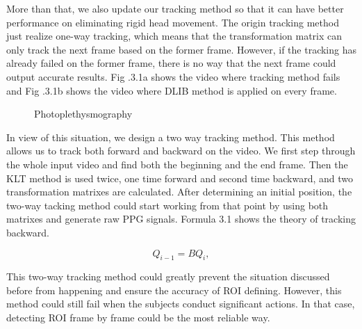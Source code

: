 More than that, we also update our tracking method so that it can have better performance on eliminating rigid head movement. The origin tracking method just realize one-way tracking, which means that the transformation matrix can only track the next frame based on the former frame. However, if the tracking has already failed on the former frame, there is no way that the next frame could output accurate results. Fig .3.1a shows the video where tracking method fails and Fig .3.1b shows the video where DLIB method is applied on every frame. 

\begin{figure}[ht]
\hspace{-0.5in}
\caption{Photoplethysmography }\label{fig:noted-figure}
\end{figure}

In view of this situation, we design a two way tracking method. This method allows us to track both forward and backward on the video. We first step through the whole input video and find both the beginning and the end frame. Then the KLT method is used twice, one time forward and second time backward, and two transformation matrixes are calculated. After determining an initial position, the two-way tacking method could start working from that point by using both matrixes and generate raw PPG signals. Formula 3.1 shows the theory of tracking backward.


	\begin{equation}
        Q_{i-1} = BQ_i,
    \end{equation} 

This two-way tracking method could greatly prevent the situation discussed before from happening and ensure the accuracy of ROI defining. However, this method could still fail when the subjects conduct significant actions. In that case, detecting ROI frame by frame could be the most reliable way.

